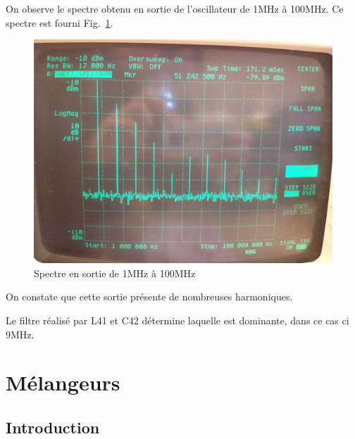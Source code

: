 \documentclass{article}
\begin{document}

On observe le spectre obtenu en sortie de l'oscillateur de 1MHz à 100MHz. Ce spectre est fourni Fig.~\ref{fig:osc_quartz_spectre_large}.

\begin{figure}[h]
	\centering
	\includegraphics[width = 0.7\linewidth]{7_3_6_1MHz_100MHz.jpg}
	\caption{Spectre en sortie de 1MHz à 100MHz}
	\label{fig:osc_quartz_spectre_large}
\end{figure}

On constate que cette sortie présente de nombreuses harmoniques.




Le filtre réalisé par L41 et C42 détermine laquelle est dominante, dans ce cas ci 9MHz.

\section{Mélangeurs}

\subsection{Introduction}
\label{subsec:mel_intro}
\end{document}
